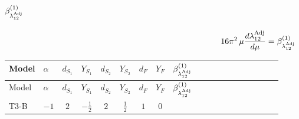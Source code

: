 \documentclass{article}
\begin{document}
\begin{landscape}
\section*{$\beta_{\lambda_{12}^{\rm Adj}}^{(1)}$}
\[16\pi^2\,\mu\frac{d \lambda_{12}^{\rm Adj}}{d\mu}=\beta_{\lambda_{12}^{\rm Adj}}^{(1)}\]
\tiny
\begin{longtable}{@{}llcccccc >{\raggedright\arraybackslash}p{0.54\linewidth}@{}}
\toprule
Model & $\alpha$ & $d_{S_1}$ & $Y_{S_1}$ & $d_{S_2}$ & $Y_{S_2}$ & $d_F$ & $Y_F$ & $\beta_{\lambda_{12}^{\rm Adj}}^{(1)}$ \\
\midrule
\endfirsthead
\toprule
Model & $\alpha$ & $d_{S_1}$ & $Y_{S_1}$ & $d_{S_2}$ & $Y_{S_2}$ & $d_F$ & $Y_F$ & $\beta_{\lambda_{12}^{\rm Adj}}^{(1)}$ \\
\midrule
\endhead
T3-B & $-1$ & $2$ & $-\frac{1}{2}$ & $2$ & $\frac{1}{2}$ & $1$ & $0$ & \scriptsize\adjustbox{max width=\linewidth}{$\begin{gathered} {\lambda_{12}^{\rm Adj}} (2 \operatorname{Tr}\!\left({y_1}\,\left({y_1}\right)^{\dagger}\right)+2 \operatorname{Tr}\!\left({y_2}\,\left({y_2}\right)^{\dagger}\right)) \\ +{\lambda_{S_1^\dagger S_2 S_2^{\dagger 2}}} \left(\frac{2}{3} \operatorname{Tr}\!\left({y_1}\,\left({y_2}\right)^{\dagger}\right)+\frac{4}{3} (5 \left({\lambda_{S_1^\dagger S_2 S_2^{\dagger 2}}}\right)^{*}+\left({\lambda_{S_1 S_1^{\dagger 2}S_2^\dagger}}\right)^{*})\right) \\ +{\lambda_{S_1 S_1^{\dagger 2}S_2^\dagger}} \left(\frac{2}{3} \operatorname{Tr}\!\left({y_1}\,\left({y_2}\right)^{\dagger}\right)+\frac{4}{3} (\left({\lambda_{S_1^\dagger S_2 S_2^{\dagger 2}}}\right)^{*}+5 \left({\lambda_{S_1 S_1^{\dagger 2}S_2^\dagger}}\right)^{*})\right) \\ +\frac{2}{3} (\left({\lambda_{S_1^\dagger S_2 S_2^{\dagger 2}}}\right)^{*}+\left({\lambda_{S_1 S_1^{\dagger 2}S_2^\dagger}}\right)^{*}) \operatorname{Tr}\!\left({y_2}\,\left({y_1}\right)^{\dagger}\right) \\ -\frac{8}{3} \operatorname{Tr}\!\left({y_1}\,\left({y_1}\right)^{\dagger}\,{y_2}\,\left({y_2}\right)^{\dagger}\right) \\ +\frac{64}{3} {\lambda_{S_1^{\dagger 2}S_2^{\dagger 2}}} \left({\lambda_{S_1^{\dagger 2}S_2^{\dagger 2}}}\right)^{*} \\ +\frac{4}{3} {\lambda_{T3}} \left({\lambda_{T3}}\right)^{*} \\ +{g_Y}^2 \left(-6 {g_2}^2-3 {\lambda_{12}^{\rm Adj}}\right) \\ -9 {g_2}^2 {\lambda_{12}^{\rm Adj}} \\ +8 {\lambda_{12}} {\lambda_{12}^{\rm Adj}} \\ +2 {\lambda_{12}^{\rm Adj}} {\lambda_{S_1}} \\ +2 {\lambda_{12}^{\rm Adj}} {\lambda_{S_2}} \\ +{\lambda_{H1}^{\rm Adj}} {\lambda_{H2}^{\rm Adj}}\end{gathered}$} \\

\end{longtable}
\end{landscape}
\end{document}
